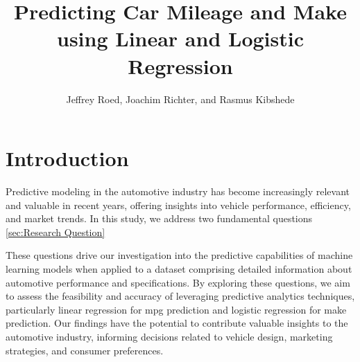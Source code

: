 \documentclass[a4paper, twocolumn]{article}
\author{Jeffrey Roed, Joachim Richter, and Rasmus Kibshede}
\title{Predicting Car Mileage and Make using Linear and Logistic Regression}
\begin{document}




\section{Introduction\label{sec:Introduction}}
Predictive modeling in the automotive industry has become increasingly relevant and valuable in recent years, offering insights into vehicle performance, efficiency, and market trends. In this study, we address two fundamental questions \ref{sec:Research Question}
 
These questions drive our investigation into the predictive capabilities of machine learning models when applied to a dataset comprising detailed information about automotive performance and specifications. By exploring these questions, we aim to assess the feasibility and accuracy of leveraging predictive analytics techniques, particularly linear regression for mpg prediction and logistic regression for make prediction. Our findings have the potential to contribute valuable insights to the automotive industry, informing decisions related to vehicle design, marketing strategies, and consumer preferences.
\end{document}
